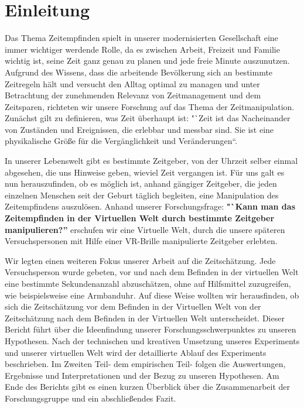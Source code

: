 \documentclass{Bericht}
\begin{document}
\maketitle


\tableofcontents
\clearpage

\section{Einleitung} %
	Das Thema Zeitempfinden spielt in unserer modernisierten Gesellschaft eine immer wichtiger werdende Rolle, da es zwischen Arbeit, Freizeit und Familie wichtig ist, seine Zeit ganz genau zu planen und jede freie Minute auszunutzen. Aufgrund des Wissens, dass die arbeitende Bevölkerung sich an bestimmte Zeitregeln hält und versucht den Alltag optimal zu managen und unter Betrachtung der zunehmenden Relevanz von Zeitmanagement und dem Zeitsparen, richteten wir unsere Forschung auf das Thema der Zeitmanipulation. Zunächst gilt zu definieren, was Zeit überhaupt ist: "`Zeit ist das Nacheinander von Zuständen und Ereignissen, die erlebbar und messbar sind. Sie ist eine physikalische Größe für die Vergänglichkeit und Veränderungen“. 

	In unserer Lebenswelt gibt es bestimmte Zeitgeber, von der Uhrzeit selber einmal abgesehen, die uns Hinweise geben, wieviel Zeit vergangen ist. Für uns galt es nun herauszufinden, ob es möglich ist, anhand gängiger Zeitgeber, die jeden einzelnen Menschen seit der Geburt täglich begleiten, eine Manipulation des Zeitempfindens auszulösen. Anhand unserer Forschungsfrage: \textbf{"`Kann man das Zeitempfinden in der Virtuellen Welt durch bestimmte Zeitgeber manipulieren?''} erschufen wir eine Virtuelle Welt, durch die unsere späteren Versuchspersonen mit Hilfe einer VR-Brille manipulierte Zeitgeber erlebten. 

	 Wir legten einen weiteren Fokus unserer Arbeit auf die Zeitschätzung. Jede Versuchsperson wurde gebeten, vor und nach dem Befinden in der virtuellen Welt eine bestimmte Sekundenanzahl abzuschätzen, ohne auf Hilfsmittel zuzugreifen, wie beispielsweise eine Armbanduhr. Auf diese Weise wollten wir herausfinden, ob sich die Zeitschätzung vor dem Befinden in der Virtuellen Welt von der Zeitschätzung nach dem Befinden in der Virtuellen Welt unterscheidet.
Dieser Bericht führt über die Ideenfindung unserer Forschungsschwerpunktes zu unseren Hypothesen. Nach der technischen und kreativen Umsetzung unseres Experiments und unserer virtuellen Welt wird der detaillierte Ablauf des Experiments beschrieben. Im Zweiten Teil- dem empirischen Teil- folgen die Auswertungen, Ergebnisse und Interpretationen und der Bezug zu unseren Hypothesen. Am Ende des Berichts gibt es einen kurzen Überblick über die Zusammenarbeit der Forschungsgruppe und ein abschließendes Fazit. 
\end{document}

